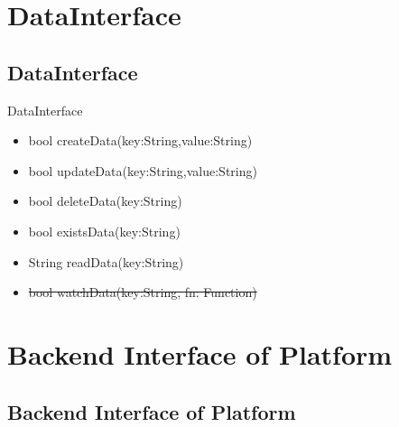 \documentclass{beamer}
\newcommand{\drawLinkArrowVertical}[4]{
	\draw[->] let
		\p1 = (#1), \p2 = (#2),
		\p3 = (#3), \p4 = (#4)
		in
		({(\x1 + \x2)*1/2} ,\y1) -- ({(\x3 + \x4)*1/2} ,\y4);
}
\newcommand{\drawBox}[5]{{0}
		\shade[top color=#4,bottom color=#4,xslant=#5] (#1) rectangle (#2) node[midway,below] {#3};
}
\begin{document}
\section {DataInterface}
\subsection {DataInterface}
\begin{frame}
\begin{block}{DataInterface}
		\begin{itemize}
			\item bool \alert{createData}(key:String,value:String)
			\item bool \alert{updateData}(key:String,value:String)
			\item bool \alert{deleteData}(key:String)
			\item bool \alert{existsData}(key:String)
			\item String \alert{readData}(key:String)
			\item \sout{bool \alert{watchData}(key:String, fn: Function)}
		\end{itemize}
	\end{block}

\end{frame}


\section {Backend Interface of Platform}
\subsection {Backend Interface of Platform}
\begin{frame}
\end{frame}
\end{document}
